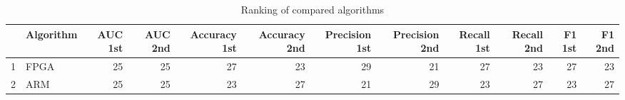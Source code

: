 \begin{table}
\footnotesize
\caption{Ranking of compared algorithms}
\label{tab:places}
\begin{tabular}{llrrrrrrrrrr}
\hline
 & Algorithm & AUC 1st & AUC 2nd & Accuracy 1st & Accuracy 2nd & Precision 1st & Precision 2nd & Recall 1st & Recall 2nd & F1 1st & F1 2nd \\
\hline
1 & FPGA & 25 & 25 & 27 & 23 & 29 & 21 & 27 & 23 & 27 & 23 \\
2 & ARM & 25 & 25 & 23 & 27 & 21 & 29 & 23 & 27 & 23 & 27 \\
\hline
\end{tabular}
\end{table}
